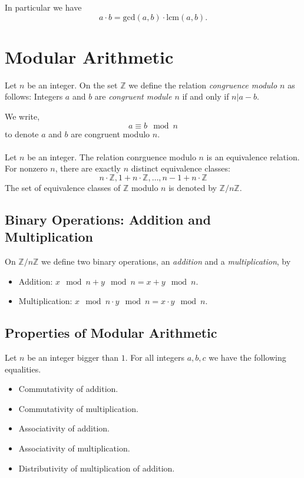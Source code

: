 \documentclass[fleqn]{article}
\begin{document}
In particular we have
\begin{equation*}
    a \cdot b = \text{gcd}(a,b) \cdot \text{lcm}(a,b).
\end{equation*}

\section{Modular Arithmetic}
Let $n$ be an integer. On the set $\mathbb{Z}$ we define the relation \textit{congruence modulo $n$}
as follows: Integers $a$ and $b$ are \textit{congruent module $n$} if and only if
$n | a -b$.

We write,
\begin{equation*}
    a \equiv b \mod n
\end{equation*}
to denote $a$ and $b$ are congruent modulo $n$.\\
\\
Let $n$ be an integer. The relation conrguence modulo $n$ is an equivalence relation.
For nonzero $n$, there are exactly $n$ distinct equivalence classes:
\begin{equation*}
    n \cdot \mathbb{Z}, 1 + n \cdot \mathbb{Z}, \dots, n-1 + n \cdot \mathbb{Z}
\end{equation*}
The set of equivalence classes of $\mathbb{Z}$ modulo $n$ is denoted by $\mathbb{Z} / n\mathbb{Z}$.

\subsection{Binary Operations: Addition and Multiplication}
On $\mathbb{Z}/n\mathbb{Z}$ we define two binary operations, an \textit{addition}
and a \textit{multiplication}, by
\begin{itemize}
    \item Addition: $x \mod n + y \mod n = x + y \mod n$.
    \item Multiplication: $x \mod n \cdot y \mod n = x \cdot y \mod n$.
\end{itemize}

\subsection{Properties of Modular Arithmetic}
Let $n$ be an integer bigger than $1$. For all integers $a, b, c$ we have the following equalities.
\begin{itemize}
    \item Commutativity of addition.
    \item Commutativity of multiplication.
    \item Associativity of addition.
    \item Associativity of multiplication.
    \item Distributivity of multiplication of addition.
\end{itemize}
\end{document}
